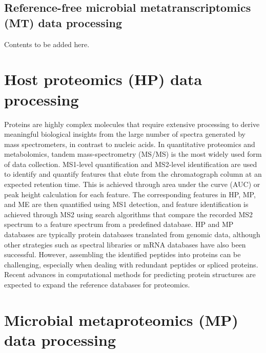 \documentclass[
]{book}
\begin{document}
\normalsize

\hypertarget{microbial-metatranscriptomics-data-processing-reference-free}{%
\section{Reference-free microbial metatranscriptomics (MT) data processing}\label{microbial-metatranscriptomics-data-processing-reference-free}}

Contents to be added here.

\hypertarget{host-proteomics-data-processing}{%
\chapter{Host proteomics (HP) data processing}\label{host-proteomics-data-processing}}

Proteins are highly complex molecules that require extensive processing to derive meaningful biological insights from the large number of spectra generated by mass spectrometers, in contrast to nucleic acids. In quantitative proteomics and metabolomics, tandem mass-spectrometry (MS/MS) is the most widely used form of data collection. MS1-level quantification and MS2-level identification are used to identify and quantify features that elute from the chromatograph column at an expected retention time. This is achieved through area under the curve (AUC) or peak height calculation for each feature. The corresponding features in HP, MP, and ME are then quantified using MS1 detection, and feature identification is achieved through MS2 using search algorithms that compare the recorded MS2 spectrum to a feature spectrum from a predefined database. HP and MP databases are typically protein databases translated from genomic data, although other strategies such as spectral libraries or mRNA databases have also been successful. However, assembling the identified peptides into proteins can be challenging, especially when dealing with redundant peptides or spliced proteins. Recent advances in computational methods for predicting protein structures are expected to expand the reference databases for proteomics.

\hypertarget{microbial-metaproteomics-data-processing}{%
\chapter{Microbial metaproteomics (MP) data processing}\label{microbial-metaproteomics-data-processing}}
\end{document}
